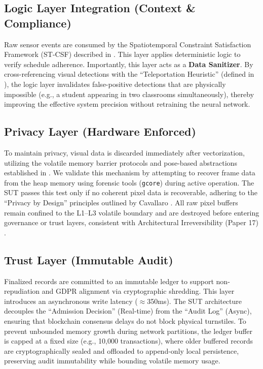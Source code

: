 \documentclass[conference]{IEEEtran}
\begin{document}
\subsection{Logic Layer Integration (Context \& Compliance)}
Raw sensor events are consumed by the Spatiotemporal Constraint Satisfaction Framework (ST-CSF) described in \cite{p4}. This layer applies deterministic logic to verify schedule adherence. Importantly, this layer acts as a \textbf{Data Sanitizer}. By cross-referencing visual detections with the ``Teleportation Heuristic'' (defined in \cite{p4}), the logic layer invalidates false-positive detections that are physically impossible (e.g., a student appearing in two classrooms simultaneously), thereby improving the effective system precision without retraining the neural network.

\subsection{Privacy Layer (Hardware Enforced)}
To maintain privacy, visual data is discarded immediately after vectorization, utilizing the volatile memory barrier protocols and pose-based abstractions established in \cite{p3}. We validate this mechanism by attempting to recover frame data from the heap memory using forensic tools (\texttt{gcore}) during active operation. The SUT passes this test only if no coherent pixel data is recoverable, adhering to the ``Privacy by Design'' principles outlined by Cavallaro \cite{b13}. All raw pixel buffers remain confined to the L1--L3 volatile boundary and are destroyed before entering governance or trust layers, consistent with Architectural Irreversibility (Paper 17) \cite{p17}.

\subsection{Trust Layer (Immutable Audit)}
Finalized records are committed to an immutable ledger to support non-repudiation and GDPR alignment via cryptographic shredding. This layer introduces an asynchronous write latency ($\approx$350ms). The SUT architecture decouples the ``Admission Decision'' (Real-time) from the ``Audit Log'' (Async), ensuring that blockchain consensus delays do not block physical turnstiles. To prevent unbounded memory growth during network partitions, the ledger buffer is capped at a fixed size (e.g., 10,000 transactions), where older buffered records are cryptographically sealed and offloaded to append-only local persistence, preserving audit immutability while bounding volatile memory usage.
\end{document}
